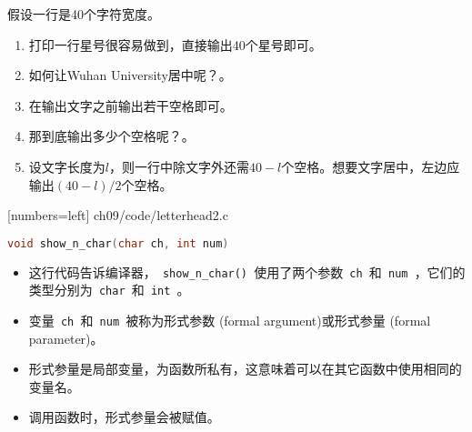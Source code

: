 \begin{frame}[fragile]
假设一行是40个字符宽度。\vspace{0.1in} \pause 

\begin{enumerate}
\item
打印一行星号很容易做到，直接输出40个星号即可。\\[0.1in] \pause 
\item 
如何让Wuhan University居中呢？。
\\[0.1in] \pause 
\item[]
在输出文字之前输出若干空格即可。\\[0.1in] \pause 
\item 
那到底输出多少个空格呢？。
\\[0.1in] \pause 
\item[]
设文字长度为$l$，则一行中除文字外还需$40-l$个空格。想要文字居中，左边应输出$(40-l)/2$个空格。
\end{enumerate}

\end{frame}

\begin{frame}

[numbers=left]
{ch09/code/letterhead2.c}
\end{frame}


\begin{frame}[fragile]
\begin{lstlisting}[language=c,backgroundcolor=\color{red!10},title=函数头]
  void show_n_char(char ch, int num)
\end{lstlisting}
\begin{itemize}
\item
这行代码告诉编译器，\lstinline| show_n_char() |使用了两个参数\lstinline| ch |和\lstinline| num |，它们的类型分别为\lstinline| char |和\lstinline| int |。\\[0.1in]
\item
变量\lstinline| ch |和\lstinline| num |被称为形式参数{ (formal argument)}或形式参量{ (formal parameter)}。\\[0.1in]
\item 形式参量是局部变量，为函数所私有，这意味着可以在其它函数中使用相同的变量名。\\[0.1in]
\item 调用函数时，形式参量会被赋值。
\end{itemize}
\end{frame}

